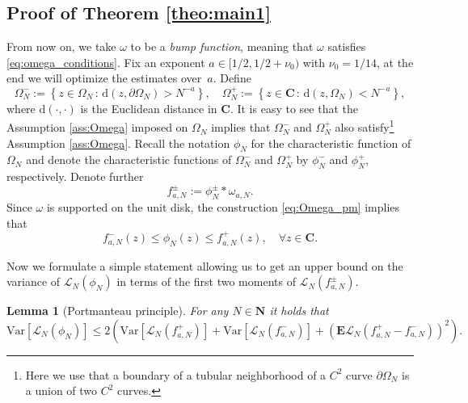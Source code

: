 \documentclass[10pt]{amsart}
\newtheorem{lemma}[theorem]{Lemma}
\numberwithin{equation}{section}
\newcommand{\E}{\mathbf{E}}
\newcommand{\C}{\mathbf{C}}
\newcommand{\N}{\mathbf{N}}
\newcommand{\Var}{\mathrm{Var}}
\begin{document}
\subsection{Proof of Theorem \ref{theo:main1}}\label{sec:proof_thm1} From now on, we take $\omega$ to be a \emph{bump function}, meaning that $\omega$ satisfies \eqref{eq:omega_conditions}.
Fix an exponent $a\in[1/2,1/2+\nu_0)$ with $\nu_0=1/14$, at the end we will optimize the estimates over~$a$. Define
\begin{equation}
\Omega_N^-:=\left\lbrace z\in \Omega_N\,:\, \mathrm{d}(z,\partial{\Omega}_N)> N^{-a}\right\rbrace, \quad\Omega_N^+:=\left\lbrace z\in \C\,:\, \mathrm{d}(z,\Omega_N)< N^{-a}\right\rbrace,
\label{eq:Omega_pm}
\end{equation}
where $\mathrm{d}(\cdot,\cdot)$ is the Euclidean distance in $\C$. It is easy to see that the Assumption \ref{ass:Omega} imposed on $\Omega_N$ implies that $\Omega_N^-$ and $\Omega_N^+$ also satisfy\footnote{Here we use that a boundary of a tubular neighborhood of a $C^2$ curve $\partial\Omega_N$ is a union of two $C^2$ curves.} Assumption \ref{ass:Omega}. Recall the notation $\phi_N$ for the characteristic function of $\Omega_N$ and denote the characteristic functions of $\Omega_N^-$ and $\Omega_N^+$ by $\phi_N^-$ and $\phi_N^+$, respectively. Denote further 
\begin{equation}
f_{a,N}^{\pm}:=\phi_N^\pm *\omega_{a,N}.
\label{eq:def_f_pm}
\end{equation}
Since $\omega$ is supported on the unit disk, the construction \eqref{eq:Omega_pm} implies that
\begin{equation}
f_{a,N}^-(z) \le \phi_N(z)\le f_{a,N}^+(z),\quad \forall z\in\C.
\label{eq:f_phi_order}
\end{equation}

Now we formulate a simple statement allowing us to get an upper bound on the variance of $\mathcal{L}_N(\phi_N)$ in terms of the first two moments of $\mathcal{L}_N(f_{a,N}^\pm)$.

\begin{lemma}[Portmanteau principle]\label{lem:Portm} For any $N\in\N$ it holds that
\begin{equation}
\Var \left[\mathcal{L}_N(\phi_N)\right]\le 2\left(\Var \left[\mathcal{L}_N(f_{a,N}^+)\right] + \Var \left[\mathcal{L}_N(f_{a,N}^-)\right] + \left( \E\mathcal{L}_N(f_{a,N}^+-f_{a,N}^-)\right)^2\right).
\label{eq:Var_pm_bound}
\end{equation}
\end{lemma}
\end{document}

